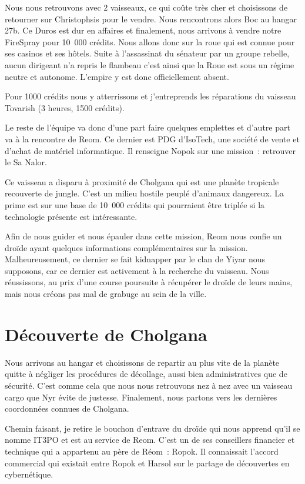 \documentclass[a4paper,9pt,twoside,twocolumn,openany]{book}
\begin{document}
Nous nous retrouvons avec 2 vaisseaux, ce qui coûte très cher et choisissons de retourner sur Christophsis pour le vendre. Nous rencontrons alors Boc au hangar 27b. Ce Duros est dur en affaires et finalement, nous arrivons à vendre notre FireSpray pour 10\ 000 crédits.
Nous allons donc sur la roue qui est connue pour ses casinos et ses hôtels. Suite à l’assassinat du sénateur par un groupe rebelle, aucun dirigeant n’a repris le flambeau c’est ainsi que la Roue est sous un régime neutre et autonome. L’empire y est donc officiellement absent.

Pour 1000 crédits nous y atterrissons et j’entreprends les réparations du vaisseau Tovarish (3 heures, 1500 crédits).

Le reste de l’équipe va donc d’une part faire quelques emplettes et d’autre part va à la rencontre de Reom. Ce dernier est PDG d’IsoTech, une société de vente et d’achat de matériel informatique. Il renseigne Nopok sur une mission\ : retrouver le Sa Nalor.

Ce vaisseau a disparu à proximité de Cholgana qui est une planète tropicale recouverte de jungle. C’est un milieu hostile peuplé d’animaux dangereux. La prime est sur une base de 10\ 000 crédits qui pourraient être triplée si la technologie présente est intéressante.

Afin de nous guider et nous épauler dans cette mission, Reom nous confie un droïde ayant quelques informations complémentaires sur la mission. Malheureusement, ce dernier se fait kidnapper par le clan de Yiyar nous supposons, car ce dernier est activement à la recherche du vaisseau. Nous réussissons, au prix d’une course poursuite à récupérer le droïde de leurs mains, mais nous créons pas mal de grabuge au sein de la ville.

\section{Découverte de Cholgana}
\subtitle{30 juillet 2016}

Nous arrivons au hangar et choisissons de repartir au plus vite de la planète quitte à négliger les procédures de décollage, aussi bien administratives que de sécurité. C’est comme cela que nous nous retrouvons nez à nez avec un vaisseau cargo que Nyr évite de justesse. Finalement, nous partons vers les dernières coordonnées connues de Cholgana.

Chemin faisant, je retire le bouchon d’entrave du droïde qui nous apprend qu’il se nomme IT3PO et est au service de Reom. C’est un de ses conseillers financier et technique qui a appartenu au père de Réom\ : Ropok. Il connaissait l'accord commercial qui existait entre Ropok et Harsol sur le partage de découvertes en cybernétique.
\end{document}
